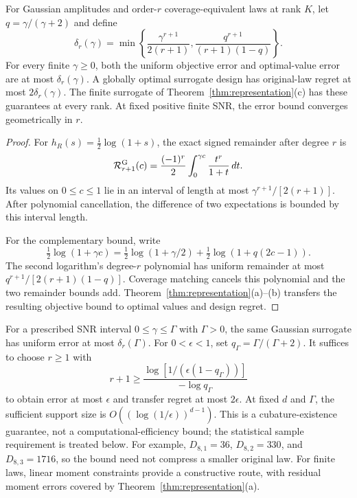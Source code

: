 \begin{corollary}\label{cor:gaussian_representation}
For Gaussian amplitudes and order-$r$ coverage-equivalent laws at rank $K$, let $q=\gamma/(\gamma+2)$ and define
\begin{equation}
\delta_r(\gamma)=\min\left\{\frac{\gamma^{r+1}}{2(r+1)},
\frac{q^{r+1}}{(r+1)(1-q)}\right\}.
\label{eq:compression_delta}
\end{equation}
For every finite $\gamma\ge0$, both the uniform objective error and optimal-value error are at most $\delta_r(\gamma)$. A globally optimal surrogate design has original-law regret at most $2\delta_r(\gamma)$. The finite surrogate of Theorem~\ref{thm:representation}(c) has these guarantees at every rank. At fixed positive finite SNR, the error bound converges geometrically in $r$.
\end{corollary}
\begin{proof}
For $h_R(s)=\tfrac12\log(1+s)$, the exact signed remainder after degree $r$ is
\begin{equation}
\mathcal R_{r+1}^{\rm G}(c)=\frac{(-1)^r}{2}\int_0^{\gamma c}\frac{t^r}{1+t}\,dt.
\label{eq:signed_remainder}
\end{equation}
Its values on $0\le c\le1$ lie in an interval of length at most $\gamma^{r+1}/[2(r+1)]$. After polynomial cancellation, the difference of two expectations is bounded by this interval length.

For the complementary bound, write
\begin{equation}
\tfrac12\log(1+\gamma c)=\tfrac12\log(1+\gamma/2)
+\tfrac12\log(1+q(2c-1)).
\end{equation}
The second logarithm's degree-$r$ polynomial has uniform remainder at most $q^{r+1}/[2(r+1)(1-q)]$. Coverage matching cancels this polynomial and the two remainder bounds add. Theorem~\ref{thm:representation}(a)--(b) transfers the resulting objective bound to optimal values and design regret.
\end{proof}

For a prescribed SNR interval $0\le\gamma\le\Gamma$ with $\Gamma>0$, the same Gaussian surrogate has uniform error at most $\delta_r(\Gamma)$. For $0<\epsilon<1$, set $q_\Gamma=\Gamma/(\Gamma+2)$. It suffices to choose $r\ge1$ with
\begin{equation}
r+1\ge\frac{\log[1/(\epsilon(1-q_\Gamma))]}{-\log q_\Gamma}
\label{eq:error_budget}
\end{equation}
to obtain error at most $\epsilon$ and transfer regret at most $2\epsilon$. At fixed $d$ and $\Gamma$, the sufficient support size is $O((\log(1/\epsilon))^{d-1})$. This is a cubature-existence guarantee, not a computational-efficiency bound; the statistical sample requirement is treated below. For example, $D_{8,1}=36$, $D_{8,2}=330$, and $D_{8,3}=1716$, so the bound need not compress a smaller original law. For finite laws, linear moment constraints provide a constructive route, with residual moment errors covered by Theorem~\ref{thm:representation}(a).


